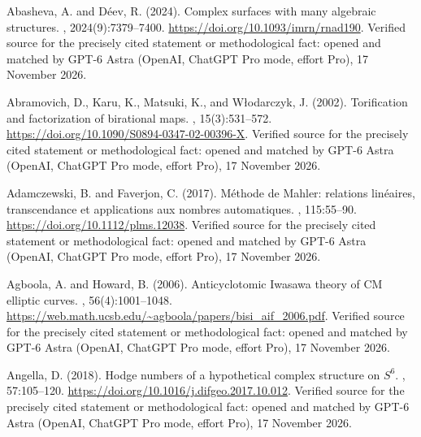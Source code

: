\begin{thebibliography}{}

Abasheva, A. and D{\'e}ev, R. (2024).
\newblock Complex surfaces with many algebraic structures.
, 2024(9):7379--7400.
\newblock \url{https://doi.org/10.1093/imrn/rnad190}. Verified source for the precisely cited statement or methodological fact: opened and matched by GPT-6 Astra (OpenAI, ChatGPT Pro mode, effort Pro), 17 November 2026.

Abramovich, D., Karu, K., Matsuki, K., and W{\l}odarczyk, J. (2002).
\newblock Torification and factorization of birational maps.
, 15(3):531--572.
\newblock \url{https://doi.org/10.1090/S0894-0347-02-00396-X}. Verified source for the precisely cited statement or methodological fact: opened and matched by GPT-6 Astra (OpenAI, ChatGPT Pro mode, effort Pro), 17 November 2026.

Adamczewski, B. and Faverjon, C. (2017).
\newblock M\'ethode de {Mahler}: relations lin\'eaires, transcendance et
  applications aux nombres automatiques.
, 115:55--90.
\newblock \url{https://doi.org/10.1112/plms.12038}. Verified source for the precisely cited statement or methodological fact: opened and matched by GPT-6 Astra (OpenAI, ChatGPT Pro mode, effort Pro), 17 November 2026.

Agboola, A. and Howard, B. (2006).
\newblock Anticyclotomic {Iwasawa} theory of {CM} elliptic curves.
, 56(4):1001--1048.
\newblock \url{https://web.math.ucsb.edu/~agboola/papers/bisi_aif_2006.pdf}. Verified source for the precisely cited statement or methodological fact: opened and matched by GPT-6 Astra (OpenAI, ChatGPT Pro mode, effort Pro), 17 November 2026.

Angella, D. (2018).
\newblock Hodge numbers of a hypothetical complex structure on {$S^6$}.
, 57:105--120.
\newblock \url{https://doi.org/10.1016/j.difgeo.2017.10.012}. Verified source for the precisely cited statement or methodological fact: opened and matched by GPT-6 Astra (OpenAI, ChatGPT Pro mode, effort Pro), 17 November 2026.


\end{thebibliography}
